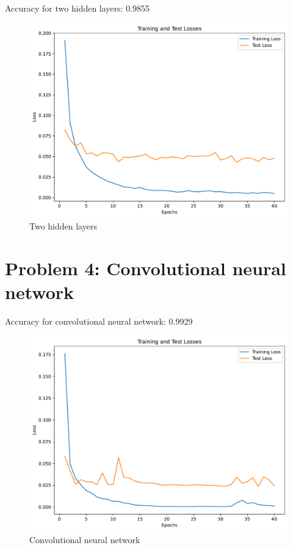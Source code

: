 \documentclass[a4paper]{article}
\begin{document}
Accuracy for two hidden layers: 0.9855


\begin{figure}[H]
  \begin{center}
    \includegraphics[width=\textwidth]{ola/two_hidden_layer.pdf}
    \caption{Two hidden layers}
    \label{fig:two_hidden_layers}
  \end{center}
\end{figure}

\section*{Problem 4: Convolutional neural network}

Accuracy for convolutional neural network: 0.9929



\begin{figure}[H]
  \begin{center}
    \includegraphics[width=\textwidth]{ola/cnn.pdf}
    \caption{Convolutional neural network}
    \label{fig:convolutional_neural_network}
  \end{center}
\end{figure}
\end{document}

